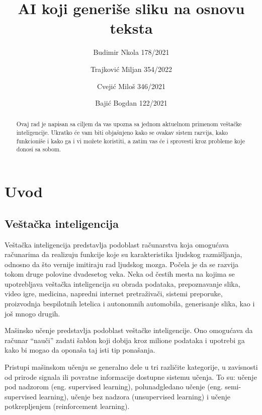 \documentclass[12pt, letterpaper]{article}
\begin{document}
\title{AI koji generiše sliku na osnovu teksta}
\author{Budimir Nkola 178/2021\\ \and Trajković Miljan 354/2022 \and Cvejić Miloš 346/2021\\ \and Bajić Bogdan 122/2021}
\maketitle

\begin{abstract}
    Ovaj rad je napisan sa ciljem da vas upozna sa jednom aktuelnom primenom veštačke inteligencije. Ukratko će vam biti objašnjeno kako se ovakav sistem razvija, kako funkcioniše i kako ga i vi možete koristiti, a zatim vas će i sprovesti kroz probleme koje donosi sa sobom.
\end{abstract}
\begin{tableofcontents}
\end{tableofcontents}

\pagebreak 

\section{Uvod} 

\subsection*{Veštačka inteligencija} 

Veštačka inteligencija predstavlja podoblast računarstva koja omogućava računarima da realizuju funkcije koje su karakteristika ljudskog razmišljanja, odnosno da što vernije imitiraju rad ljudskog mozga. Počela je da se razvija tokom druge polovine dvadesetog veka. Neka od čestih mesta na kojima se upotrebljava veštačka inteligencija su obrada podataka, prepoznavanje slika, video igre, medicina, napredni internet pretraživači, sistemi preporuke, proizvodnja bespilotnih letelica i autonomnih automobila, generisanje slika, kao i još mnogo drugih.  

  

Mašinsko učenje predstavlja podoblast veštačke inteligencije. Ono omogućava da računar “nauči” zadati šablon koji dobija kroz milione podataka i upotrebi ga kako bi mogao da oponaša taj isti tip ponašanja.   

  

Pristupi mašinskom učenju se generalno dele u tri različite kategorije, u zavisnosti od prirode signala ili povratne informacije dostupne sistemu učenja. To su: učenje pod nadzorom (eng. supervised learning), polunadgledano učenje (eng. semi-supervised learning), učenje bez nadzora (unsupervised learning) i učenje potkrepljenjem (reinforcement learning).  
\end{document}

